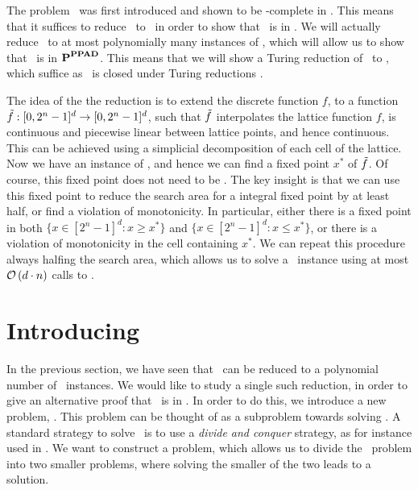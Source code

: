 The problem \Brouwer\ was first introduced and shown to be \PPAD-complete in . This means that it suffices to reduce \Tarski\ to \Brouwer\ in order to show that \Tarski\ is in \PPAD. We will actually reduce \Tarski\ to at most polynomially many instances of \Brouwer, which will allow us to show that \Tarski\ is in $\textbf{P}^{\textbf{PPAD}}$. This means that we will show a Turing reduction of \Tarski\ to \Brouwer, which suffice as \PPAD\ is closed under Turing reductions .

The idea of the the reduction is to extend the discrete function $f$, to a function $\Tilde{f} : [0, 2^n - 1]^d \rightarrow [0, 2^n - 1]^d$, such that $\Tilde{f}$ interpolates the lattice function $f$, is continuous and piecewise linear between lattice points, and hence continuous. This can be achieved using a simplicial decomposition of each cell of the lattice. Now we have an instance of \Brouwer, and hence we can find a fixed point $x^*$ of $\Tilde{f}$. Of course, this fixed point does not need to be 
.
The key insight is that we can use this fixed point to reduce the search area for a integral fixed point by at least half, or find a violation of monotonicity. In particular, either there is a fixed point in both $\{x \in [2^n-1]^d : x \geq x^*\}$ and $\{x \in [2^n-1]^d : x \leq x^*\}$, or there is a violation of monotonicity in the cell containing $x^*$.
We can repeat this procedure always halfing the search area, which allows us to solve a \Tarski\ instance using at most $\mathcal{O}\left(d \cdot n\right)$ calls to \Brouwer.

\section{Introducing \Tarskistar}

In the previous section, we have seen that \Tarski\ can be reduced to a polynomial number of \Brouwer\ instances. We would like to study a single such reduction, in order to give an alternative proof that \Tarski\ is in \PPAD. In order to do this, we introduce a new problem, \Tarskistar. This problem can be thought of as a subproblem towards solving \Tarski. A standard strategy to solve \Tarski\ is to use a \emph{divide and conquer} strategy, as for instance used in . We want to construct a problem, which allows us to divide the \Tarski\ problem into two smaller problems, where solving the smaller of the two leads to a solution.

